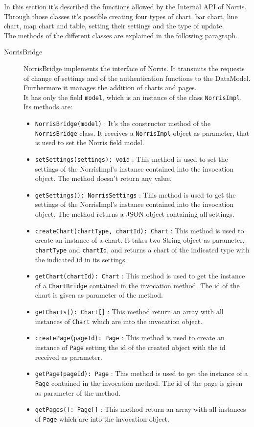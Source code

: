 	In this section it's described the functions allowed by the Internal API of Norris. Through those classes it's possible creating four types of chart, bar chart, line chart, map chart and table, setting their settings and the type of update.\\ The methods of the different classes are explained in the following paragraph.
	\begin{description}
	\item[NorrisBridge] NorrisBridge implements the interface of Norris. It transmits the requests of change of settings and of the authentication functions to the DataModel. Furthermore it manages the addition of charts and pages. \\It has only the field \texttt{model}, which is an instance of the class \texttt{NorrisImpl}. Its methods are:
		\begin{itemize}
		\item \texttt{NorrisBridge(model)} :  It's the constructor method of the \texttt{NorrisBridge} class. It receives a \texttt{NorrisImpl} object as parameter, that is used to set the Norris field model.
		\item \texttt{setSettings(settings): void} : This method is used to set the settings of the NorrisImpl's instance contained into the invocation object. The method doesn't return any value.
		\item \texttt{getSettings(): NorrisSettings} : This method is used to get the settings of the NorrisImpl's instance contained into the invocation object. The method returns a JSON object containing all settings.
		\item \texttt{createChart(chartType, chartId): Chart} : This method is used to create an instance of a chart. It takes two String object as parameter, \texttt{chartType} and \texttt{chartId}, and returns a chart of the indicated type with the indicated id in its settings.
		\item \texttt{getChart(chartId): Chart} : This method is used to get the instance of a \texttt{ChartBridge} contained in the invocation method. The id of the chart is given as parameter of the method.
		\item \texttt{getCharts(): Chart[]} : This method return an array with all instances of \texttt{Chart} which are into the invocation object.
		\item \texttt{createPage(pageId): Page} : This method is used to create an instance of \texttt{Page} setting the id of the created object with the id received as parameter.
		\item \texttt{getPage(pageId): Page} : This method is used to get the instance of a \texttt{Page} contained in the invocation method. The id of the page is given as parameter of the method.
		\item \texttt{getPages(): Page[]} : This method return an array with all instances of \texttt{Page} which are into the invocation object.
		

\end{itemize}
\end{description}
